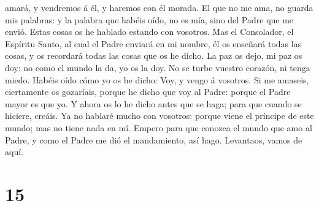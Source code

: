 amará, y vendremos á él, y haremos con él morada.  El que
no me ama, no guarda mis palabras: y la palabra que habéis oído, no es
mía, sino del Padre que me envió.  Estas cosas os he
hablado estando con vosotros.  Mas el Consolador, el
Espíritu Santo, al cual el Padre enviará en mi nombre, él os enseñará
todas las cosas, y os recordará todas las cosas que os he dicho.
 La paz os dejo, mi paz os doy: no como el mundo la da,
yo os la doy. No se turbe vuestro corazón, ni tenga miedo.
 Habéis oído cómo yo os he dicho: Voy, y vengo á
vosotros. Si me amaseis, ciertamente os gozaríais, porque he dicho que
voy al Padre: porque el Padre mayor es que yo.  Y ahora
os lo he dicho antes que se haga; para que cuando se hiciere, creáis.
 Ya no hablaré mucho con vosotros: porque viene el
príncipe de este mundo; mas no tiene nada en mí.  Empero
para que conozca el mundo que amo al Padre, y como el Padre me dió el
mandamiento, así hago. Levantaos, vamos de aquí.

\hypertarget{section-14}{%
\section{15}\label{section-14}}

